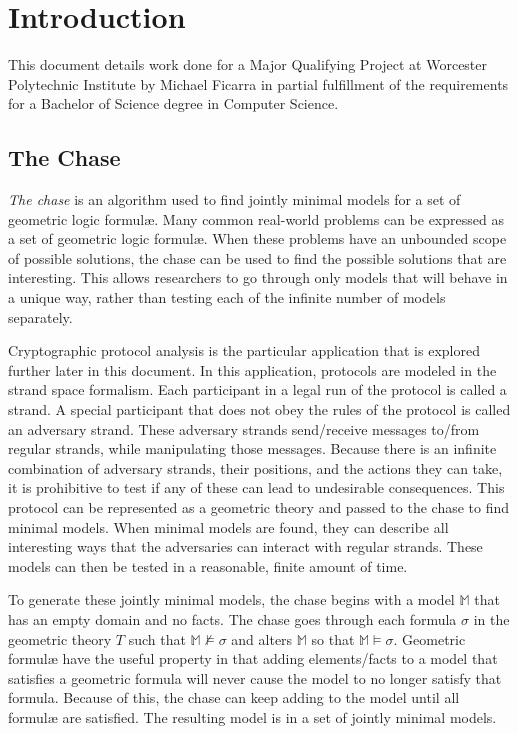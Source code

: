 \section{Introduction}

	This document details work done for a Major Qualifying Project at Worcester
	Polytechnic Institute by Michael Ficarra in partial fulfillment of the
	requirements for a Bachelor of Science degree in Computer Science.

	\subsection{The Chase}

		\emph{The chase} is an algorithm used to find jointly minimal models
		for a set of geometric logic formul{\ae}. Many common real-world
		problems can be expressed as a set of geometric logic formul{\ae}. When
		these problems have an unbounded scope of possible solutions, the chase
		can be used to find the possible solutions that are interesting. This
		allows researchers to go through only models that will behave in a
		unique way, rather than testing each of the infinite number of models
		separately.

		Cryptographic protocol analysis is the particular application that is
		explored further later in this document. In this application, protocols
		are modeled in the strand space formalism. Each participant in a legal
		run of the protocol is called a strand. A special participant that does
		not obey the rules of the protocol is called an adversary strand. These
		adversary strands send/receive messages to/from regular strands, while
		manipulating those messages. Because there is an infinite combination
		of adversary strands, their positions, and the actions they can take,
		it is prohibitive to test if any of these can lead to undesirable
		consequences. This protocol can be represented as a geometric theory
		and passed to the chase to find minimal models. When minimal models are
		found, they can describe all interesting ways that the adversaries can
		interact with regular strands. These models can then be tested in a
		reasonable, finite amount of time.

		To generate these jointly minimal models, the chase begins with a model
		$\mathbb{M}$ that has an empty domain and no facts. The chase goes
		through each formula $\sigma$ in the geometric theory $T$ such that
		$\mathbb{M} \not\models \sigma$ and alters $\mathbb{M}$ so that
		$\mathbb{M} \models \sigma$. Geometric formul{\ae} have the useful
		property in that adding elements/facts to a model that satisfies a
		geometric formula will never cause the model to no longer satisfy that
		formula.  Because of this, the chase can keep adding to the model until
		all formul{\ae} are satisfied. The resulting model is in a set of
		jointly minimal models.


